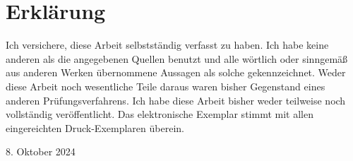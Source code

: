 \chapter*{Erklärung}

Ich versichere, diese Arbeit selbstständig verfasst zu haben.
Ich habe keine anderen als die angegebenen Quellen benutzt und alle wörtlich oder sinngemäß aus anderen Werken übernommene Aussagen als solche gekennzeichnet.
Weder diese Arbeit noch wesentliche Teile daraus waren bisher Gegenstand eines anderen Prüfungsverfahrens.
Ich habe diese Arbeit bisher weder teilweise noch vollständig veröffentlicht. Das elektronische Exemplar stimmt mit allen eingereichten Druck-Exemplaren überein.

\vspace{1cm}

\begin{flushright}
    8. Oktober 2024\hspace{0.5cm} \makebox[4cm]{\hrulefill}
\end{flushright}